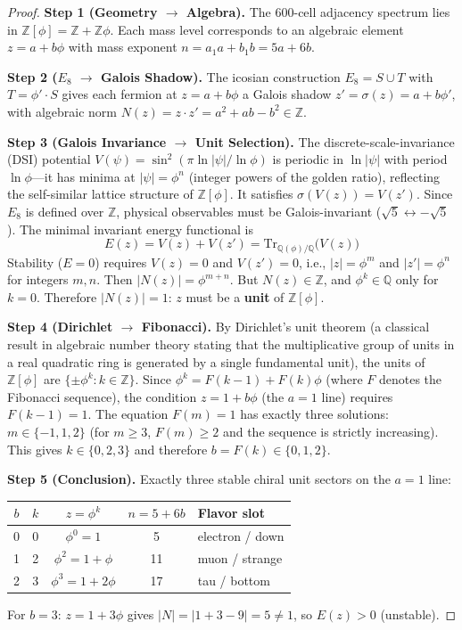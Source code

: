 \documentclass[12pt,a4paper]{article}
\theoremstyle{definition}
\begin{document}
\begin{proof}
\textbf{Step 1 (Geometry $\to$ Algebra).} The 600-cell adjacency spectrum lies in $\mathbb{Z}[\phi] = \mathbb{Z} + \mathbb{Z}\phi$. Each mass level corresponds to an algebraic element $z = a + b\phi$ with mass exponent $n = a_1 a + b_1 b = 5a + 6b$.

\textbf{Step 2 ($E_8$ $\to$ Galois Shadow).} The icosian construction $E_8 = S \cup T$ with $T = \phi' \cdot S$ gives each fermion at $z = a + b\phi$ a Galois shadow $z' = \sigma(z) = a + b\phi'$, with algebraic norm $N(z) = z \cdot z' = a^2 + ab - b^2 \in \mathbb{Z}$.

\textbf{Step 3 (Galois Invariance $\to$ Unit Selection).} The discrete-scale-invariance (DSI) potential $V(\psi) = \sin^2(\pi \ln|\psi|/\ln\phi)$ is periodic in $\ln|\psi|$ with period $\ln\phi$---it has minima at $|\psi| = \phi^n$ (integer powers of the golden ratio), reflecting the self-similar lattice structure of $\mathbb{Z}[\phi]$.  It satisfies $\sigma(V(z)) = V(z')$. Since $E_8$ is defined over $\mathbb{Z}$, physical observables must be Galois-invariant ($\sqrt{5} \leftrightarrow -\sqrt{5}$). The minimal invariant energy functional is
\begin{equation}
E(z) = V(z) + V(z') = \text{Tr}_{\mathbb{Q}(\phi)/\mathbb{Q}}\bigl(V(z)\bigr)
\end{equation}
Stability ($E = 0$) requires $V(z) = 0$ and $V(z') = 0$, i.e., $|z| = \phi^m$ and $|z'| = \phi^n$ for integers $m, n$. Then $|N(z)| = \phi^{m+n}$. But $N(z) \in \mathbb{Z}$, and $\phi^k \in \mathbb{Q}$ only for $k = 0$. Therefore $|N(z)| = 1$: $z$ must be a \textbf{unit} of $\mathbb{Z}[\phi]$.

\textbf{Step 4 (Dirichlet $\to$ Fibonacci).} By Dirichlet's unit theorem (a classical result in algebraic number theory stating that the multiplicative group of units in a real quadratic ring is generated by a single fundamental unit), the units of $\mathbb{Z}[\phi]$ are $\{\pm\phi^k : k \in \mathbb{Z}\}$. Since $\phi^k = F(k-1) + F(k)\phi$ (where $F$ denotes the Fibonacci sequence), the condition $z = 1 + b\phi$ (the $a = 1$ line) requires $F(k-1) = 1$. The equation $F(m) = 1$ has exactly three solutions: $m \in \{-1, 1, 2\}$ (for $m \geq 3$, $F(m) \geq 2$ and the sequence is strictly increasing). This gives $k \in \{0, 2, 3\}$ and therefore $b = F(k) \in \{0, 1, 2\}$.

\textbf{Step 5 (Conclusion).} Exactly three stable chiral unit sectors on the $a = 1$ line:
\begin{center}
\begin{tabular}{ccccl}
\toprule
$b$ & $k$ & $z = \phi^k$ & $n = 5 + 6b$ & Flavor slot \\
\midrule
0 & 0 & $\phi^0 = 1$ & 5 & electron / down \\
1 & 2 & $\phi^2 = 1+\phi$ & 11 & muon / strange \\
2 & 3 & $\phi^3 = 1+2\phi$ & 17 & tau / bottom \\
\bottomrule
\end{tabular}
\end{center}
For $b = 3$: $z = 1 + 3\phi$ gives $|N| = |1 + 3 - 9| = 5 \neq 1$, so $E(z) > 0$ (unstable).
\end{proof}
\end{document}

